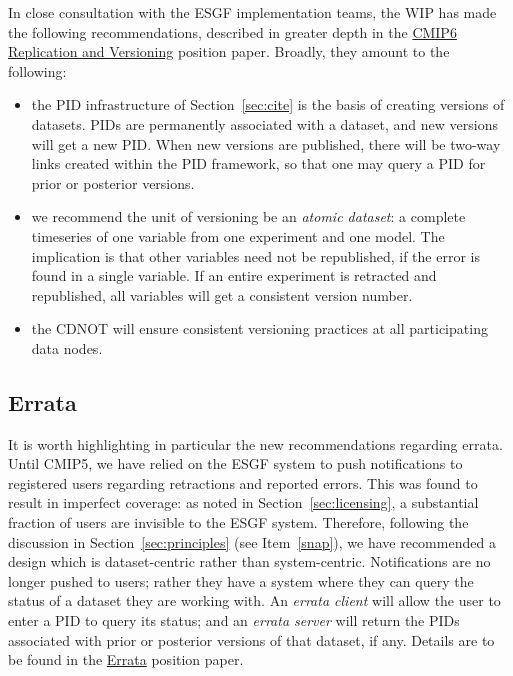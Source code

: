 \documentclass[gmd,manuscript]{copernicus}
\newcommand{\secref}[1] {\mbox{Section  \ref{sec:#1}}}
\begin{document}
In close consultation with the ESGF implementation teams, the WIP has
made the following recommendations, described in greater depth in the
\href{https://goo.gl/jqWjQ5}{CMIP6 Replication and Versioning}
position paper. Broadly, they amount to the following:

\begin{itemize}
\item the PID infrastructure of \secref{cite} is the basis of creating
  versions of datasets. PIDs are permanently associated with a
  dataset, and new versions will get a new PID. When new versions are
  published, there will be two-way links created within the PID
  framework, so that one may query a PID for prior or posterior versions.
\item we recommend the unit of versioning be an \emph{atomic dataset}:
  a complete timeseries of one variable from one experiment and one
  model. The implication is that other variables need not be
  republished, if the error is found in a single variable. If an
  entire experiment is retracted and republished, all variables will
  get a consistent version number.
\item the CDNOT will ensure consistent versioning practices at all
  participating data nodes.
\end{itemize}


\subsection{Errata}
\label{sec:errata}


It is worth highlighting in particular the new recommendations
regarding errata. Until CMIP5, we have relied on the ESGF system to
push notifications to registered users regarding retractions and
reported errors. This was found to result in imperfect coverage: as
noted in \secref{licensing}, a substantial fraction of users are
invisible to the ESGF system. Therefore, following the discussion in
\secref{principles} (see Item~\ref{snap}), we have recommended a
design which is dataset-centric rather than system-centric.
Notifications are no longer pushed to users; rather they have a system
where they can query the status of a dataset they are working with. An
\emph{errata client} will allow the user to enter a PID to query its
status; and an \emph{errata server} will return the PIDs associated
with prior or posterior versions of that dataset, if any. Details are
to be found in the \href{https://goo.gl/qjs8WK}{Errata} position
paper.
\end{document}
